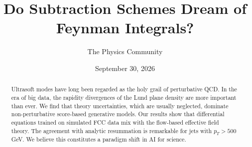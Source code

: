 \documentclass[11pt]{article}
\title{Do Subtraction Schemes Dream of Feynman Integrals?}
\author{The Physics Community}
\date{September 30, 2026}
\begin{document}
\maketitle
\begin{abstract}
Ultrasoft modes have long been regarded as the holy grail of
perturbative QCD. In the era of big data, the rapidity divergences of
the Lund plane density are more important than ever. We find that theory
uncertainties, which are usually neglected, dominate non-perturbative
score-based generative models. Our results show that differential
equations trained on simulated FCC data mix with the flow-based
effective field theory. The agreement with analytic resummation is
remarkable for jets with $p_T > 500$ GeV. We believe this constitutes a
paradigm shift in AI for science.
\end{abstract}
\tableofcontents





\nocite{*}


\end{document}
